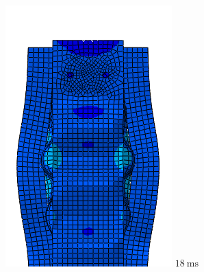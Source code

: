 \documentclass[
documentsize = a4, %
font = cmr, %
typesize = 11, %
printmode = true,
onehalfspacing = true,
language = en, %
titlepage = udciccp, %
degree = pt, %
dedication = true,
acknowledgements = true,
abstract-en = true,
abstract-es = false,
abstract-ga = false,
epigraphs = true,
toc = true,
lof = true,
lot = true,
frontmatterintoc = false,
notation = false,
minimal = false,
]{UDCthesis}
\begin{document}
\begin{figure}
\begin{minipage}[b]{.15\linewidth}
		\includegraphics[width=\linewidth]{IMG_CUTRES/c6}
		$\SI{18}{\ms}$
	\end{minipage}
	\quad
	\begin{minipage}[b]{.15\linewidth}
		\centering

\end{minipage}
\end{figure}
\end{document}

